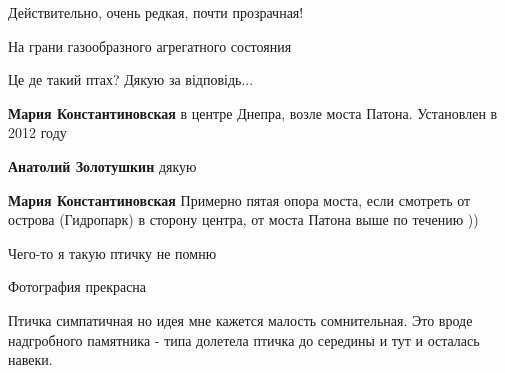  
 
 
 
 

Действительно, очень редкая, почти прозрачная!

На грани газообразного агрегатного состояния

Це де такий птах? Дякую за відповідь...

\begin{itemize} %
\textbf{Мария Константиновская} в центре Днепра, возле моста Патона. Установлен в 2012 году

\textbf{Анатолий Золотушкин} дякую

\textbf{Мария Константиновская} Примерно пятая опора моста, если смотреть от острова (Гидропарк) в сторону центра, от моста Патона выше по течению ))
\end{itemize} %

Чего-то я такую птичку не помню

Фотография прекрасна


Птичка симпатичная но идея мне кажется малость сомнительная. Это вроде
надгробного памятника - типа долетела птичка до середины и тут и осталась
навеки.
